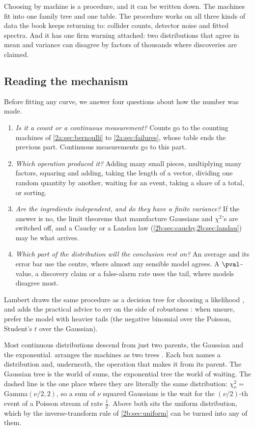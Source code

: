 Choosing by machine is a procedure, and it can be written down. The machines fit into one family tree and one table. The procedure works on all three kinds of data the book keeps returning to: collider counts, detector noise and fitted spectra. And it has one firm warning attached: two distributions that agree in mean and variance can disagree by factors of thousands where discoveries are claimed.

\subsection{Reading the mechanism}
\label{2b:sec:which-procedure}

Before fitting any curve, we answer four questions about how the number was made.
\begin{enumerate}[leftmargin=1.6em,itemsep=1pt]
  \item \emph{Is it a count or a continuous measurement?} Counts go to the counting machines of \cref{2a:sec:bernoulli} to \cref{2a:sec:failures}, whose table ends the previous part. Continuous measurements go to this part.
  \item \emph{Which operation produced it?} Adding many small pieces, multiplying many factors, squaring and adding, taking the length of a vector, dividing one random quantity by another, waiting for an event, taking a share of a total, or sorting.
  \item \emph{Are the ingredients independent, and do they have a finite variance?} If the answer is no, the limit theorems that manufacture Gaussians and $\chi^2$'s are switched off, and a Cauchy or a Landau law (\cref{2b:sec:cauchy,2b:sec:landau}) may be what arrives.
  \item \emph{Which part of the distribution will the conclusion rest on?} An average and its error bar use the centre, where almost any sensible model agrees. A $\pval$-value, a discovery claim or a false-alarm rate uses the tail, where models disagree most.
\end{enumerate}
Lambert draws the same procedure as a decision tree for choosing a likelihood , and adds the practical advice to err on the side of robustness : when unsure, prefer the model with heavier tails (the negative binomial over the Poisson, Student's $t$ over the Gaussian).

Most continuous distributions descend from just two parents, the Gaussian and the exponential.  arranges the machines as two trees . Each box names a distribution and, underneath, the operation that makes it from its parent. The Gaussian tree is the world of sums, the exponential tree the world of waiting. The dashed line is the one place where they are literally the same distribution: $\chi^2_\nu=$ Gamma$(\nu/2,2)$, so a sum of $\nu$ squared Gaussians is the wait for the $(\nu/2)$-th event of a Poisson stream of rate $\frac12$. Above both sits the uniform distribution, which by the inverse-transform rule of \cref{2b:sec:uniform} can be turned into any of them.

